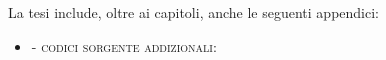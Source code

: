 La tesi include, oltre ai capitoli, anche le seguenti appendici:

\begin{itemize}

\item {} - \textsc{codici sorgente addizionali}:

\end{itemize}